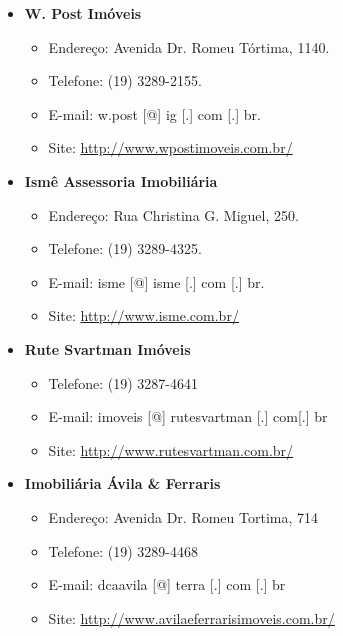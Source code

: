 \begin{itemize}
\item  \textbf{W. Post Imóveis}
\begin{itemize}
\item  Endereço: Avenida Dr. Romeu Tórtima, 1140.
\item  Telefone: (19) 3289-2155.
\item  E-mail: w.post [@] ig [.] com [.] br.
\item  Site: \url{http://www.wpostimoveis.com.br/}
\end{itemize}
\end{itemize}

\begin{itemize}
\item  \textbf{Ismê Assessoria Imobiliária}
\begin{itemize}
\item  Endereço: Rua Christina G. Miguel, 250.
\item  Telefone: (19) 3289-4325.
\item  E-mail: isme [@] isme [.] com [.] br.
\item  Site: \url{http://www.isme.com.br/}
\end{itemize}
\end{itemize}

\begin{itemize}
\item  \textbf{Rute Svartman Imóveis}
\begin{itemize}
\item  Telefone: (19) 3287-4641
\item  E-mail: imoveis [@] rutesvartman [.] com[.] br
\item  Site: \url{http://www.rutesvartman.com.br/}
\end{itemize}
\end{itemize}

\begin{itemize}
\item  \textbf{Imobiliária Ávila \& Ferraris}
\begin{itemize}
\item  Endereço: Avenida Dr. Romeu Tortima, 714
\item  Telefone: (19) 3289-4468
\item  E-mail: dcaavila [@] terra [.] com [.] br
\item  Site: \url{http://www.avilaeferrarisimoveis.com.br/}
\end{itemize}
\end{itemize}

